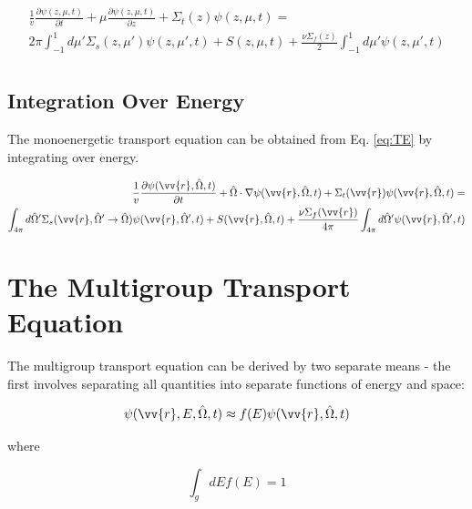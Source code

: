 \documentclass[10pt]{article}
\newcommand{\hO}{\hat{\Omega}}
\newcommand{\spa}{(\vv{r}, E, \hO, t)}
\begin{document}
\begin{flushleft}
\begin{equation}
\label{eq:TE_Cartesian_1D_2_noenergy}
\begin{aligned}
\frac{1}{v} \frac{\partial\psi(z, \mu,t)}{\partial t} + \mu \frac{\partial \psi(z, \mu,t)}{\partial z} +
 \Sigma_t(z)\psi(z, \mu,t) =\\
 2\pi\int_{-1}^{1} d\mu' \Sigma_s(z, \mu')\psi(z,\mu',t) + S(z, \mu, t)+\frac{\nu\Sigma_f(z)}{2}\int_{-1}^{1} d\mu'\psi(z, \mu',t)\\
\end{aligned}
\end{equation}

\subsection{Integration Over Energy}

The monoenergetic transport equation can be obtained from Eq. \eqref{eq:TE} by integrating over energy. 

\begin{equation}
\label{eq:TEMonoenergetic}
\begin{aligned}
\frac{1}{v} \frac{\partial\psi(\vv{r},\hO  ,t)}{\partial t} +
 \hO  \cdot\nabla\psi(\vv{r}, \hO  ,t) + 
 \Sigma_t(\vv{r})\psi(\vv{r}, \hO  ,t) = \\
\int_{4\pi}^{ } d\hO  ' \Sigma_s(\vv{r}, \hO  '\rightarrow\hO  )\psi(\vv{r}, \hO  ',t) + S(\vv{r}, \hO  ,t)+\frac{\nu\Sigma_f(\vv{r})}{4\pi} \int_{4\pi}^{} d\hO  '\psi(\vv{r},\hO  ',t)\\
\end{aligned}
\end{equation}

\clearpage

\section{The Multigroup Transport Equation}

The multigroup transport equation can be derived by two separate means - the first involves separating all quantities into separate functions of energy and space:

\begin{equation}
\label{eq:MultiGroupSeparate}
\psi\spa  \approx f(E)\psi(\vv{r}, \hO  ,t)
\end{equation}

where

\begin{equation}
\label{eq:f_E_normalized}
\int_{g} dEf(E) = 1
\end{equation}


\end{flushleft}
\end{document}
